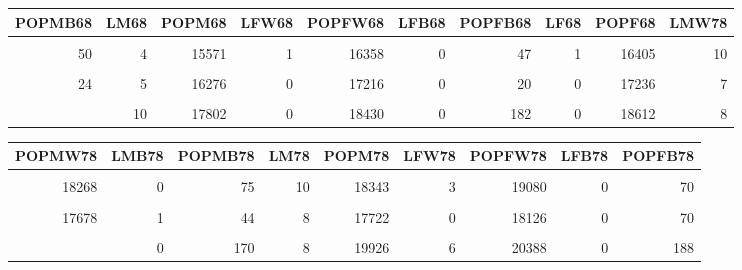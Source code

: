 \documentclass[
  12pt,
]{article}
\begin{document}
\begin{longtable}{rrrrrrrrrr}
\toprule
\textbf{POPMB68} & \textbf{LM68} & \textbf{POPM68} & \textbf{LFW68} & \textbf{POPFW68} & \textbf{LFB68} & \textbf{POPFB68} & \textbf{LF68} & \textbf{POPF68} & \textbf{LMW78}\\
\midrule
\cellcolor{gray!10}{25956} & \cellcolor{gray!10}{147} & \cellcolor{gray!10}{231377} & \cellcolor{gray!10}{27} & \cellcolor{gray!10}{220106} & \cellcolor{gray!10}{1} & \cellcolor{gray!10}{28527} & \cellcolor{gray!10}{28} & \cellcolor{gray!10}{248633} & \cellcolor{gray!10}{149}\\
50 & 4 & 15571 & 1 & 16358 & 0 & 47 & 1 & 16405 & 10\\
\cellcolor{gray!10}{472} & \cellcolor{gray!10}{4} & \cellcolor{gray!10}{30887} & \cellcolor{gray!10}{3} & \cellcolor{gray!10}{31131} & \cellcolor{gray!10}{0} & \cellcolor{gray!10}{496} & \cellcolor{gray!10}{3} & \cellcolor{gray!10}{31627} & \cellcolor{gray!10}{11}\\
24 & 5 & 16276 & 0 & 17216 & 0 & 20 & 0 & 17236 & 7\\
\cellcolor{gray!10}{157046} & \cellcolor{gray!10}{522} & \cellcolor{gray!10}{834231} & \cellcolor{gray!10}{88} & \cellcolor{gray!10}{734014} & \cellcolor{gray!10}{23} & \cellcolor{gray!10}{176614} & \cellcolor{gray!10}{111} & \cellcolor{gray!10}{910628} & \cellcolor{gray!10}{442}\\
\addlinespace
164 & 10 & 17802 & 0 & 18430 & 0 & 182 & 0 & 18612 & 8\\
\bottomrule
\end{longtable}
\endgroup{}

\begingroup\fontsize{9}{11}\selectfont

\begin{longtable}{rrrrrrrrr}
\toprule
\textbf{POPMW78} & \textbf{LMB78} & \textbf{POPMB78} & \textbf{LM78} & \textbf{POPM78} & \textbf{LFW78} & \textbf{POPFW78} & \textbf{LFB78} & \textbf{POPFB78}\\
\midrule
\cellcolor{gray!10}{194976} & \cellcolor{gray!10}{34} & \cellcolor{gray!10}{30252} & \cellcolor{gray!10}{183} & \cellcolor{gray!10}{225228} & \cellcolor{gray!10}{48} & \cellcolor{gray!10}{210307} & \cellcolor{gray!10}{4} & \cellcolor{gray!10}{33790}\\
18268 & 0 & 75 & 10 & 18343 & 3 & 19080 & 0 & 70\\
\cellcolor{gray!10}{35839} & \cellcolor{gray!10}{1} & \cellcolor{gray!10}{604} & \cellcolor{gray!10}{12} & \cellcolor{gray!10}{36443} & \cellcolor{gray!10}{3} & \cellcolor{gray!10}{36148} & \cellcolor{gray!10}{0} & \cellcolor{gray!10}{619}\\
17678 & 1 & 44 & 8 & 17722 & 0 & 18126 & 0 & 70\\
\cellcolor{gray!10}{567350} & \cellcolor{gray!10}{138} & \cellcolor{gray!10}{161461} & \cellcolor{gray!10}{580} & \cellcolor{gray!10}{728811} & \cellcolor{gray!10}{165} & \cellcolor{gray!10}{623107} & \cellcolor{gray!10}{36} & \cellcolor{gray!10}{186806}\\
\addlinespace
19756 & 0 & 170 & 8 & 19926 & 6 & 20388 & 0 & 188\\
\bottomrule
\end{longtable}
\endgroup{}
\end{document}

